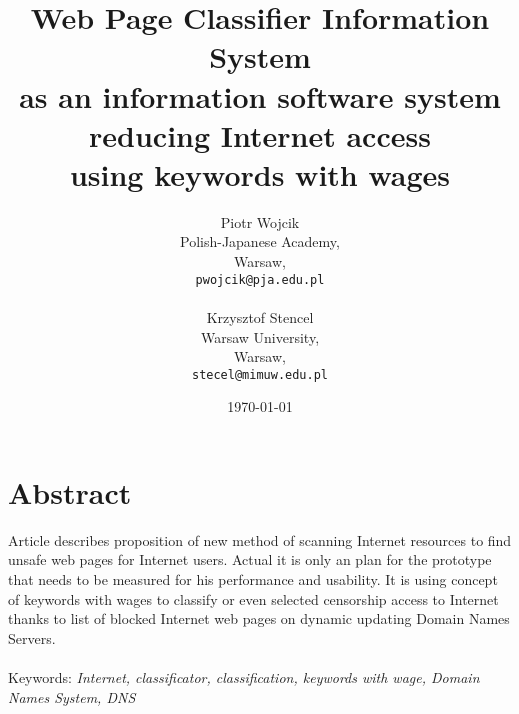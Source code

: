 \documentclass[9pt,a4paper]{extarticle}
\title{Web Page Classifier Information System\\ as an information software system\\ reducing Internet access\\ using keywords with wages}
\author{Piotr Wojcik\\
    Polish-Japanese Academy,\\
    Warsaw,\\
    \texttt{pwojcik@pja.edu.pl}\\
\\
    Krzysztof Stencel\\
    Warsaw University,\\
    Warsaw,\\
    \texttt{stecel@mimuw.edu.pl}}
\date{\today}
\begin{document}
\maketitle



\section{Abstract}
Article describes proposition of new method of scanning Internet resources to find unsafe web pages for Internet users. Actual it is only an plan for the prototype that needs to be measured for his performance and usability. It is using concept of keywords with wages to classify or even selected censorship access to Internet thanks to list of blocked Internet web pages on dynamic updating Domain Names Servers.\\
\\
Keywords: \textit{Internet, classificator, classification, keywords with wage, Domain Names System, DNS}
\end{document}
